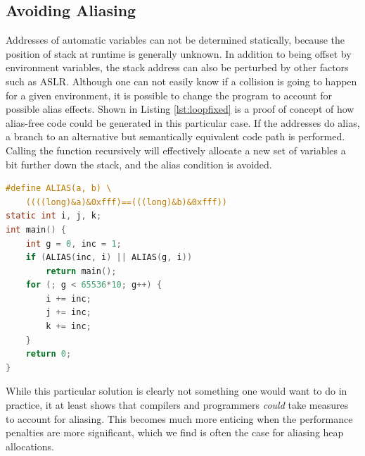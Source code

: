 \documentclass[a4paper,10pt,twocolumn,twoside]{article}
\begin{document}
{\subsection{Avoiding Aliasing}
Addresses of automatic variables can not be determined statically, because the position of stack at runtime is generally unknown. 
In addition to being offset by environment variables, the stack address can also be perturbed by other factors such as ASLR. 
Although one can not easily know if a collision is going to happen for a given environment, it is possible to change the program to account for possible alias effects.
Shown in Listing \ref{lst:loopfixed} is a proof of concept of how alias-free code could be generated in this particular case.
If the addresses do alias, a branch to an alternative but semantically equivalent code path is performed.
Calling the function recursively will effectively allocate a new set of variables a bit further down the stack, and the alias condition is avoided.

\begin{lstlisting}[float=t, language=C, caption={Dynamically detect aliasing case, and avoid by pushing another stack frame.}, label={lst:loopfixed}, frame=lines]
#define ALIAS(a, b) \
    ((((long)&a)&0xfff)==(((long)&b)&0xfff))
static int i, j, k;
int main() {
    int g = 0, inc = 1;
    if (ALIAS(inc, i) || ALIAS(g, i))
        return main();
    for (; g < 65536*10; g++) {
        i += inc;
        j += inc;
        k += inc;
    }
    return 0;
}
\end{lstlisting}

While this particular solution is clearly not something one would want to do in practice, it at least shows that compilers and programmers \emph{could} take measures to account for aliasing.
This becomes much more enticing when the performance penalties are more significant, which we find is often the case for aliasing heap allocations.



}
\end{document}
